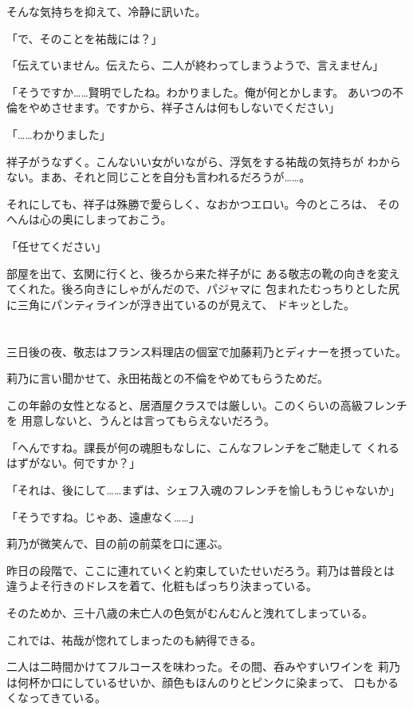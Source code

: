 ﻿\documentclass[
    book,tate,
    line_length=30zw,
    jafontsize=12pt,
    paper=b5j,
    landscape,
    ]{jlreq}
\begin{document}
そんな気持ちを抑えて、冷静に訊いた。

「で、そのことを祐哉には？」

「伝えていません。伝えたら、二人が終わってしまうようで、言えません」

「そうですか……賢明でしたね。わかりました。俺が何とかします。
あいつの不倫をやめさせます。ですから、祥子さんは何もしないでください」

「……わかりました」

祥子がうなずく。こんないい女がいながら、浮気をする祐哉の気持ちが
わからない。まあ、それと同じことを自分も言われるだろうが……。

それにしても、祥子は殊勝で愛らしく、なおかつエロい。今のところは、
そのへんは心の奥にしまっておこう。

「任せてください」

部屋を出て、玄関に行くと、後ろから来た祥子がに
ある敬志の靴の向きを変えてくれた。後ろ向きにしゃがんだので、パジャマに
包まれたむっちりとした尻に三角にパンティラインが浮き出ているのが見えて、
ドキッとした。

\section*{}

三日後の夜、敬志はフランス料理店の個室で加藤莉乃とディナーを摂っていた。

莉乃に言い聞かせて、永田祐哉との不倫をやめてもらうためだ。

この年齢の女性となると、居酒屋クラスでは厳しい。このくらいの高級フレンチを
用意しないと、うんとは言ってもらえないだろう。

「へんですね。課長が何の魂胆もなしに、こんなフレンチをご馳走して
くれるはずがない。何ですか？」

「それは、後にして……まずは、シェフ入魂のフレンチを愉しもうじゃないか」

「そうですね。じゃあ、遠慮なく……」

莉乃が微笑んで、目の前の前菜を口に運ぶ。

昨日の段階で、ここに連れていくと約束していたせいだろう。莉乃は普段とは
違うよそ行きのドレスを着て、化粧もばっちり決まっている。

そのためか、三十八歳の未亡人の色気がむんむんと洩れてしまっている。

これでは、祐哉が惚れてしまったのも納得できる。

二人は二時間かけてフルコースを味わった。その間、呑みやすいワインを
莉乃は何杯か口にしているせいか、顔色もほんのりとピンクに染まって、
口もかるくなってきている。
\end{document}
